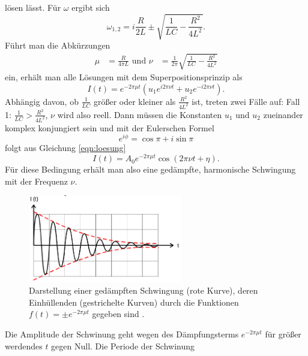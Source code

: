 lösen lässt. Für $\omega$ ergibt sich
\begin{equation}
  \omega_{1,2} = i \frac{R}{2L}\pm \sqrt{\frac{1}{L C} - \frac{R^2}{4L^2}}.
  \label{eqn:omega12}
\end{equation}
Führt man die Abkürzungen
\begin{align*}
  \mu &= \frac{R}{4 \pi L} \text{ und }
  \nu &= \frac{1}{2\pi} \sqrt{\frac{1}{L C} - \frac{R^2}{4 L^2}}
\end{align*}
ein, erhält man alle Lösungen mit dem Superpositionsprinzip als
\begin{equation}
  I(t) = e^{-2 \pi \mu t} (u_1 e^{i 2 \pi \nu t} + u_2 e^{-i 2 \pi \nu t}).
  \label{eqn:loesung}
\end{equation}
Abhängig davon, ob $\frac{1}{L C}$ größer oder kleiner als $\frac{R^2}{4L^2}$ ist,
treten zwei Fälle auf: \newline
Fall 1: $\frac{1}{L C} > \frac{R^2}{4L^2}$, $\nu$ wird also reell. Dann müssen
die Konstanten $u_1$ und $u_2$ zueinander komplex konjungiert sein und mit der
Eulerschen Formel
\begin{equation}
  e^{i\phi} = \cos{\pi} + i \sin{\pi}
  \label{eqn:euler}
\end{equation}
folgt aus Gleichung \eqref{eqn:loesung}
\begin{equation}
  I(t) = A_0 e^{-2\pi\mu t}\cos{(2\pi\nu t + \eta)}.
  \label{eqn:gedaempfte_schwingung}
\end{equation}
Für diese Bedingung erhält man also eine gedämpfte, harmonische Schwingung mit der
Frequenz $\nu$.
\begin{figure}
  \centering
  \includegraphics[width=0.6\textwidth]{gedaempfte_schwingung.png}
  \caption{Darstellung einer gedämpften Schwingung (rote Kurve), deren Einhüllenden
  (gestrichelte Kurven) durch die Funktionen $f(t)=\pm e^{-2\pi\mu t}$ gegeben
  sind \cite{sample}.}
  \label{fig:gedaempfte_schwingung}
\end{figure}
Die Amplitude der Schwinung geht wegen des Dämpfungsterms
$e^{-2\pi\mu t}$ für größer werdendes $t$ gegen Null. Die Periode der Schwinung
